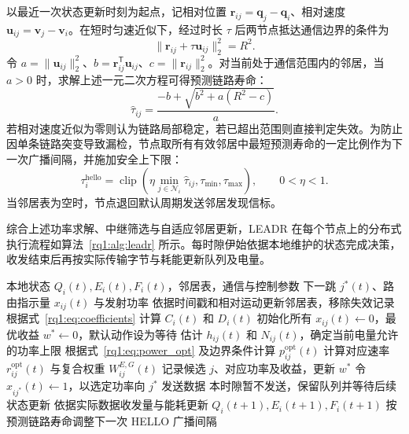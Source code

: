 以最近一次状态更新时刻为起点，记相对位置 $\bm r_{ij}=\bm q_j-\bm q_i$、相对速度 $\bm u_{ij}=\bm v_j-\bm v_i$。在短时匀速近似下，经过时长 $\tau$ 后两节点抵达通信边界的条件为
\begin{equation}
 \|\bm r_{ij}+\tau\bm u_{ij}\|_2^2=R^2.
 \label{rq1:eq:let_equation}
\end{equation}
令 $a=\|\bm u_{ij}\|_2^2$、$b=\bm r_{ij}^{\mathsf T}\bm u_{ij}$、$c=\|\bm r_{ij}\|_2^2$。对当前处于通信范围内的邻居，当 $a>0$ 时，求解上述一元二次方程可得预测链路寿命：
\begin{equation}
 \widehat\tau_{ij}=
 \frac{-b+\sqrt{b^2+a(R^2-c)}}{a}.
 \label{rq1:eq:let_solution}
\end{equation}
若相对速度近似为零则认为链路局部稳定，若已超出范围则直接判定失效。为防止因单条链路突变导致漏检，节点取所有有效邻居中最短预测寿命的一定比例作为下一次广播间隔，并施加安全上下限：
\begin{equation}
 \tau_i^{\mathrm{hello}}=
 \operatorname{clip}\!\left(\eta\min_{j\in\mathcal{N}_i}\widehat\tau_{ij},
                          \tau_{\min},\tau_{\max}\right),\qquad 0<\eta<1.
 \label{rq1:eq:hello_interval}
\end{equation}
当邻居表为空时，节点退回默认周期发送邻居发现信标。

综合上述功率求解、中继筛选与自适应邻居更新，LEADR 在每个节点上的分布式执行流程如算法~\ref{rq1:alg:leadr} 所示。每时隙伊始依据本地维护的状态完成决策，收发结束后再按实际传输字节与耗能更新队列及电量。

\begin{algorithm}[!htbp]
\label{rq1:alg:leadr}
\small
\begin{algorithmic}[1]
\Require 本地状态 $Q_i(t),E_i(t),F_i(t)$，邻居表，通信与控制参数
\Ensure 下一跳 $j^*(t)$、路由指示量 $x_{ij}(t)$ 与发射功率
\State 依据时间戳和相对运动更新邻居表，移除失效记录
\State 根据式~\eqref{rq1:eq:coefficients} 计算 $C_i(t)$ 和 $D_i(t)$
\State 初始化所有 $x_{ij}(t)\gets0$，最优收益 $w^*\gets0$，默认动作设为等待
   \State 估计 $h_{ij}(t)$ 和 $N_{ij}(t)$，确定当前电量允许的功率上限
   \State 根据式~\eqref{rq1:eq:power_opt} 及边界条件计算 $p_{ij}^{\mathrm{opt}}(t)$
   \State 计算对应速率 $r_{ij}^{\mathrm{opt}}(t)$ 与复合权重 $W_{ij}^{E,G}(t)$
    \State 记录候选 $j$、对应功率及收益，更新 $w^*$
   \EndIf
  \EndIf
 \EndFor
\EndIf
{}
 \State 令 $x_{ij^*}(t)\gets1$，以选定功率向 $j^*$ 发送数据
\Else
 \State 本时隙暂不发送，保留队列并等待后续状态更新
\EndIf
\State 依据实际数据收发量与能耗更新 $Q_i(t+1),E_i(t+1),F_i(t+1)$
\State 按预测链路寿命调整下一次 HELLO 广播间隔
\end{algorithmic}
\end{algorithm}

